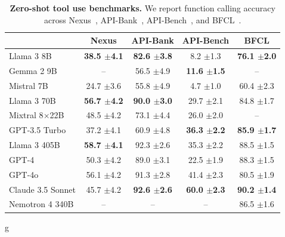 \documentclass[dvipsnames]{fairmeta}
\begin{document}
\begin{table}
\begin{NiceTabular}{lcccc}
	\CodeBefore
	\Body
	\toprule
&\textbf{Nexus} & \textbf{API-Bank} & \textbf{API-Bench} & \textbf{BFCL}\\
 \midrule
	Llama 3 8B & \textbf{38.5 \scriptsize{$\pm$4.1}}& \textbf{82.6 \scriptsize{$\pm$3.8}}& 8.2 \scriptsize{$\pm$1.3}& \textbf{76.1 \scriptsize{$\pm$2.0}}\\
	Gemma 2 9B &--& 56.5 \scriptsize{$\pm$4.9}& \textbf{11.6 \scriptsize{$\pm$1.5}}& --\\
	Mistral 7B &24.7 \scriptsize{$\pm$3.6}& 55.8 \scriptsize{$\pm$4.9}& 4.7 \scriptsize{$\pm$1.0}& 60.4 \scriptsize{$\pm$2.3}\\
	\midrule
	Llama 3 70B & \textbf{56.7 \scriptsize{$\pm$4.2}}& \textbf{90.0 \scriptsize{$\pm$3.0}}& 29.7 \scriptsize{$\pm$2.1}& 84.8 \scriptsize{$\pm$1.7}\\
	Mixtral 8$\times$22B &48.5 \scriptsize{$\pm$4.2}& 73.1 \scriptsize{$\pm$4.4}& 26.0 \scriptsize{$\pm$2.0}& --\\
	GPT-3.5 Turbo &37.2 \scriptsize{$\pm$4.1}& 60.9 \scriptsize{$\pm$4.8}& \textbf{36.3 \scriptsize{$\pm$2.2}}& \textbf{85.9 \scriptsize{$\pm$1.7}}\\
	\midrule
	Llama 3 405B & \textbf{58.7 \scriptsize{$\pm$4.1}}& 92.3 \scriptsize{$\pm$2.6}& 35.3 \scriptsize{$\pm$2.2}& 88.5 \scriptsize{$\pm$1.5}\\
	GPT-4 &50.3 \scriptsize{$\pm$4.2}& 89.0 \scriptsize{$\pm$3.1}& 22.5 \scriptsize{$\pm$1.9}& 88.3 \scriptsize{$\pm$1.5}\\
	GPT-4o &56.1 \scriptsize{$\pm$4.2}& 91.3 \scriptsize{$\pm$2.8}& 41.4 \scriptsize{$\pm$2.3}& 80.5 \scriptsize{$\pm$1.9}\\
	Claude 3.5 Sonnet &45.7 \scriptsize{$\pm$4.2}& \textbf{92.6 \scriptsize{$\pm$2.6}}& \textbf{60.0 \scriptsize{$\pm$2.3}}& \textbf{90.2 \scriptsize{$\pm$1.4}}\\
	Nemotron 4 340B &--& --& --& 86.5 \scriptsize{$\pm$1.6}\\
	\bottomrule
\end{NiceTabular}
g

  \caption{\label{tab:tools_metrics} \textbf{Zero-shot tool use benchmarks.} We report function calling accuracy across Nexus~\citep{srinivasan2023nexusraven}, API-Bank~\citep{li2023api}, API-Bench~\citep{patil2023gorilla}, and BFCL~\citep{berkeley-function-calling-leaderboard}.
  \vspace{-8mm}}
\end{table}
\end{document}
